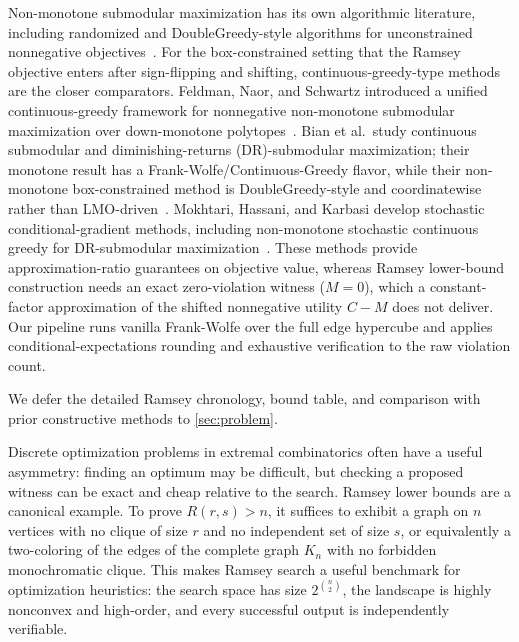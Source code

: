 \documentclass{article}
\begin{document}
Non-monotone submodular maximization has its own algorithmic literature, including randomized and DoubleGreedy-style algorithms for unconstrained nonnegative objectives~\cite{feige2011maximizing,buchbinder2015tight}. For the box-constrained setting that the Ramsey objective enters after sign-flipping and shifting, continuous-greedy-type methods are the closer comparators. Feldman, Naor, and Schwartz introduced a unified continuous-greedy framework for nonnegative non-monotone submodular maximization over down-monotone polytopes~\cite{feldman2011unified}. Bian et al.\ study continuous submodular and diminishing-returns (DR)-submodular maximization; their monotone result has a Frank-Wolfe/Continuous-Greedy flavor, while their non-monotone box-constrained method is DoubleGreedy-style and coordinatewise rather than LMO-driven~\cite{bian2017guaranteed}. Mokhtari, Hassani, and Karbasi develop stochastic conditional-gradient methods, including non-monotone stochastic continuous greedy for DR-submodular maximization~\cite{mokhtari2020stochastic}. These methods provide approximation-ratio guarantees on objective value, whereas Ramsey lower-bound construction needs an exact zero-violation witness ($M=0$), which a constant-factor approximation of the shifted nonnegative utility $C-M$ does not deliver. Our pipeline runs vanilla Frank-Wolfe over the full edge hypercube and applies conditional-expectations rounding and exhaustive verification to the raw violation count.

We defer the detailed Ramsey chronology, bound table, and comparison with prior constructive methods to \cref{sec:problem}.

\iffalse
\newpage

Discrete optimization problems in extremal combinatorics often have a useful asymmetry: finding an optimum may be difficult, but checking a proposed witness can be exact and cheap relative to the search. Ramsey lower bounds are a canonical example. To prove $R(r,s)>n$, it suffices to exhibit a graph on $n$ vertices with no clique of size $r$ and no independent set of size $s$, or equivalently a two-coloring of the edges of the complete graph $K_n$ with no forbidden monochromatic clique. This makes Ramsey search a useful benchmark for optimization heuristics: the search space has size $2^{\binom{n}{2}}$, the landscape is highly nonconvex and high-order, and every successful output is independently verifiable.
\end{document}
